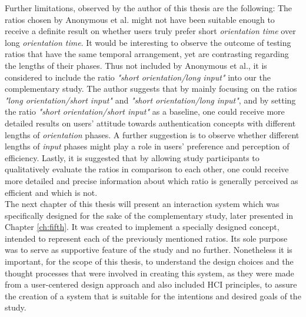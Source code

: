 Further limitations, observed by the author of this thesis are the following: The ratios chosen by Anonymous et al. \cite{anonymous} might not have been suitable enough to receive a definite result on whether users truly prefer short \textit{orientation time} over long \textit{orientation time}. It would be interesting to observe the outcome of testing ratios that have the same temporal arrangement, yet are contrasting regarding the lengths of their phases. Thus not included by Anonymous et al., it is considered to include the ratio \textit{"short orientation/long input"} into our the complementary study. The author suggests that by mainly focusing on the ratios \textit{"long orientation/short input"} and \textit{"short orientation/long input"}, and by setting the ratio \textit{"short orientation/short input"} as a baseline, one could receive more detailed results on users' attitude towards authentication concepts with different lengths of \textit{orientation} phases. A further suggestion is to observe whether different lengths of \textit{input} phases might play a role in users' preference and perception of efficiency. Lastly, it is suggested that by allowing study participants to qualitatively evaluate the ratios in comparison to each other, one could receive more detailed and precise information about which ratio is generally perceived as efficient and which is not. \\

The next chapter of this thesis will present an interaction system which was specifically designed for the sake of the complementary study, later presented in Chapter \ref{ch:fifth}. It was created to implement a specially designed concept, intended to represent each of the previously mentioned ratios. Its sole purpose was to serve as  supportive feature of the study and no further. Nonetheless it is important, for the scope of this thesis, to understand the design choices and the thought processes that were involved in creating this system, as they were made from a user-centered design approach and also included HCI principles, to assure the creation of a system that is suitable for the intentions and desired goals of the study. 







